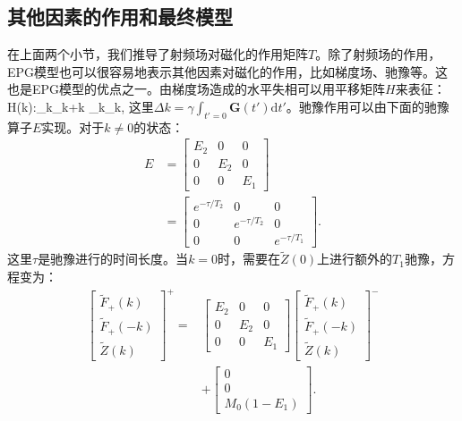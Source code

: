  \subsection{其他因素的作用和最终模型}
 在上面两个小节，我们推导了射频场对磁化的作用矩阵$T$。除了射频场的作用，EPG模型也可以很容易地表示其他因素对磁化的作用，比如梯度场、驰豫等。这也是EPG模型的优点之一。由梯度场造成的水平失相可以用平移矩阵$H$来表征：
 \beq H(\Delta k):\quad{}_k\rightarrow{}_{k+\Delta k} \quad{} \quad {}_k\rightarrow{}_k,\eeq 
 这里$\Delta k=\gamma\int_{t'=0}\textbf{G}(t')\mathrm{d}t'$。驰豫作用可以由下面的驰豫算子$E$实现。对于$k\neq 0$的状态：
  \begin{align}
 E&=
  \left[
  \begin{matrix}
   {E}_2 & 0 & 0 \\
   0 & {E}_2 & 0 \\
   0 & 0 & {E}_1
   \end{matrix}
   \right] \nonumber\\ &=
   \left[
  \begin{matrix}
   e^{-\tau/T_2} & 0 & 0 \\
   0 & e^{-\tau/T_2} & 0 \\
   0 & 0 & e^{-\tau/T_1}
   \end{matrix}
   \right].
 \end{align}
  这里$\tau$是驰豫进行的时间长度。当$k=0$时，需要在$\tilde{Z}(0)$上进行额外的$T_1$驰豫，方程变为：
 \begin{align}
 \left[
  \begin{matrix}
   \tilde{F}_+(k) \\
   \tilde{F}_+(-k) \\
   \tilde{Z}(k)
   \end{matrix}
   \right]^+
   =&
   \left[
  \begin{matrix}
   {E}_2 & 0 & 0 \\
   0 & {E}_2 & 0 \\
   0 & 0 & {E}_1
   \end{matrix}
   \right] \left[
  \begin{matrix}
   \tilde{F}_+(k) \\
   \tilde{F}_+(-k) \\
   \tilde{Z}(k)
   \end{matrix}
   \right]^- \nonumber\\
   & +
   \left[
  \begin{matrix}
   0 \\
   0 \\
   M_0(1-E_1)
   \end{matrix}
   \right].
 \end{align}
 
